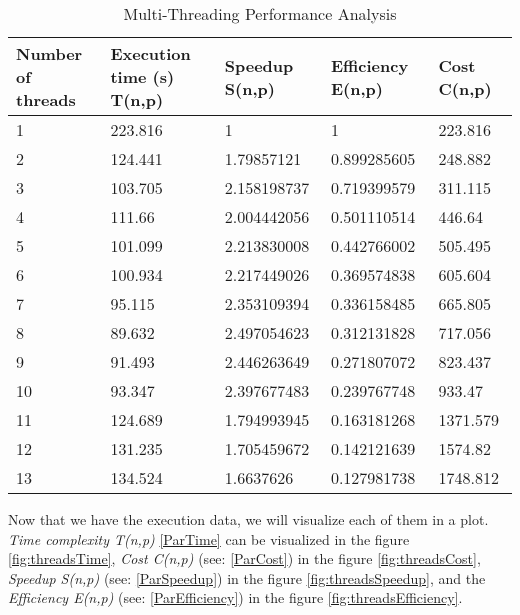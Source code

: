 \begin{table}\centering
	\caption{Multi-Threading Performance Analysis}\label{tab:threadsTime}
   	\begin{tabular}{ | p{2.5cm\textwidth} | p{2.5cm\textwidth} | p{2.5cm\textwidth} | p{2.5cm\textwidth} | p{2.5cm\textwidth} |}
   	\hline
\textbf{Number of threads} & \textbf{Execution time (s) T(n,p)}& \textbf{Speedup S(n,p)} & \textbf{Efficiency E(n,p)} & \textbf{Cost C(n,p)} \\\hline
1               & 223.816 	&	 1			&	1			&	223.816          \\\hline
2               & 124.441	&	 1.79857121	&	0.899285605	&	248.882           \\\hline
3               & 103.705	&	 2.158198737 	&	0.719399579	&	311.115           \\\hline
4               & 111.66	&	 2.004442056	&	0.501110514	&	446.64            \\\hline
5               & 101.099	&	 2.213830008	&	0.442766002	&	505.495           \\\hline
6               & 100.934	&	 2.217449026	&	0.369574838	&	605.604           \\\hline
7               & 95.115	&	 2.353109394 	&	0.336158485	&	665.805            \\\hline
8               & 89.632	&	 2.497054623	&	0.312131828	&	717.056            \\\hline
9               & 91.493	&	 2.446263649	&	0.271807072	&	823.437            \\\hline
10              & 93.347	&	 2.397677483	&	0.239767748	&	933.47            \\\hline
11              & 124.689	&	 1.794993945	&	0.163181268	&	1371.579           \\\hline
12              & 131.235	&	 1.705459672	&	0.142121639	&	1574.82           \\\hline
13              & 134.524	&	 1.6637626	&	0.127981738	&    1748.812      \\\hline

    \end{tabular}
\end{table}

Now that we have the execution data, we will visualize each of them in a plot. \emph{Time complexity T(n,p)} \ref{ParTime} can be visualized in the figure \ref{fig:threadsTime}, \emph{Cost C(n,p)} (see: \ref{ParCost}) in the figure \ref{fig:threadsCost}, \emph{Speedup S(n,p)} (see: \ref{ParSpeedup}) in the figure \ref{fig:threadsSpeedup}, and the \emph{Efficiency E(n,p)} (see: \ref{ParEfficiency}) in the figure \ref{fig:threadsEfficiency}.

